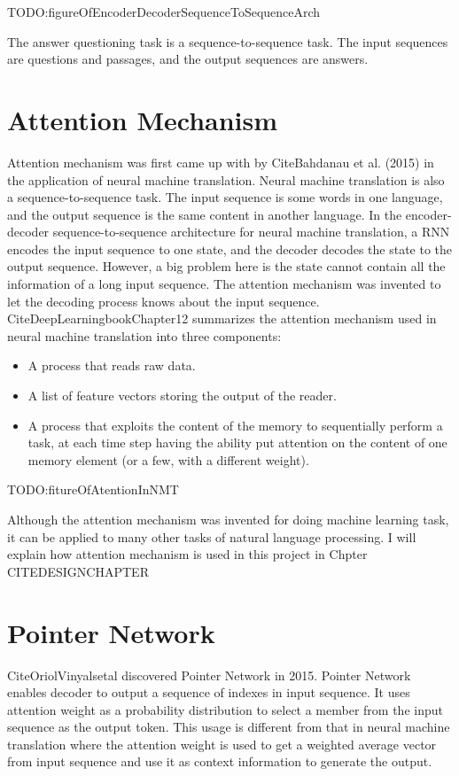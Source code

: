 \documentclass[modernstyle,12pt]{sjsuthesis}
\theoremstyle{definition}
\begin{document}
TODO:figureOfEncoderDecoderSequenceToSequenceArch

The answer questioning task is a sequence-to-sequence task. The input sequences are questions and passages, and the output sequences are answers.

\section{Attention Mechanism}

Attention mechanism was first came up with by CiteBahdanau et al. (2015) in the application of neural machine translation. Neural machine translation is also a sequence-to-sequence task. The input sequence is some words in one language, and the output sequence is the same content in another language. In the encoder-decoder sequence-to-sequence architecture for neural machine translation, a RNN encodes the input sequence to one state, and the decoder decodes the state to the output sequence. However, a big problem here is the state cannot contain all the information of a long input sequence. The attention mechanism was invented to let the decoding process knows about the input sequence. CiteDeepLearningbookChapter12 summarizes the attention mechanism used in neural machine translation into three components:
\begin{itemize}
\item{A process that reads raw data.}
\item{A list of feature vectors storing the output of the reader.}
\item{A process that exploits the content of the memory to sequentially perform a task, at each time step having the ability put attention on the content of one memory element (or a few, with a different weight).}
\end{itemize}

TODO:fitureOfAtentionInNMT

Although the attention mechanism was invented for doing machine learning task, it can be applied to many other tasks of natural language processing. I will explain how attention mechanism is used in this project in Chpter CITEDESIGNCHAPTER




\section{Pointer Network}

CiteOriolVinyalsetal discovered Pointer Network in 2015. Pointer Network enables decoder to output a sequence of indexes in input sequence. It uses attention weight as a probability distribution to select a member from the input sequence as the output token. This usage is different from that in neural machine translation where the attention weight is used to get a weighted average vector from input sequence and use it as context information to generate the output.
\end{document}
